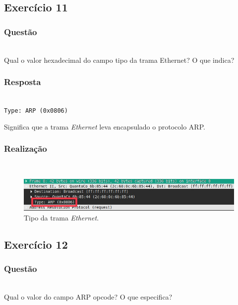 \documentclass{llncs}
\begin{document}
\clearpage
\subsection{Exercício 11}
\subsubsection{Questão}\rule[-10pt]{0pt}{10pt}\\

Qual o valor hexadecimal do campo tipo da trama Ethernet? O que indica?

\subsubsection{Resposta}\rule[-10pt]{0pt}{10pt}\\

\texttt{Type: ARP (0x0806)} 

Significa que a trama \textit{Ethernet} leva encapsulado o protocolo ARP.

\subsubsection{Realização}\rule[-10pt]{0pt}{10pt}\\

\begin{figure}
  \begin{center}
	  \includegraphics[scale=0.6]{./imagens/arp_request_type.png} 
  \end{center}
	\caption{Tipo da trama \textit{Ethernet}.}
  \label{fig:arp_request_type}
\end{figure} 


\clearpage
\subsection{Exercício 12}
\subsubsection{Questão}\rule[-10pt]{0pt}{10pt}\\

Qual o valor do campo ARP opcode? O que especifica?
\end{document}
